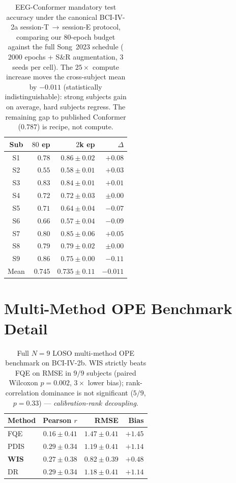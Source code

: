 \documentclass[conference]{IEEEtran}
\newcommand{\bcia}{BCI-IV-2a}
\newcommand{\bcib}{BCI-IV-2b}
\newcommand{\fqe}{FQE}
\begin{document}
\begin{table}[H]
\centering
\caption{EEG-Conformer mandatory test accuracy under the canonical
\bcia{} session-T\,$\to$\,session-E protocol, comparing our
$80$-epoch budget against the full Song~2023 schedule ($2000$
epochs + S\&R augmentation, 3 seeds per cell). The $25\times$
compute increase moves the cross-subject mean by $-0.011$
(statistically indistinguishable): strong subjects gain on average,
hard subjects regress. The remaining gap to published Conformer
($0.787$) is recipe, not compute.}
\label{tab:app:conformer_2k}
\footnotesize
\setlength{\tabcolsep}{3pt}
\begin{tabular}{c r r r}
\toprule
Sub & $80$ ep & $2$k ep & $\Delta$ \\
\midrule
S1 & $0.78$ & $0.86 \pm 0.02$ & $+0.08$ \\
S2 & $0.55$ & $0.58 \pm 0.01$ & $+0.03$ \\
S3 & $0.83$ & $0.84 \pm 0.01$ & $+0.01$ \\
S4 & $0.72$ & $0.72 \pm 0.03$ & $\pm 0.00$ \\
S5 & $0.71$ & $0.64 \pm 0.04$ & $-0.07$ \\
S6 & $0.66$ & $0.57 \pm 0.04$ & $-0.09$ \\
S7 & $0.80$ & $0.85 \pm 0.06$ & $+0.05$ \\
S8 & $0.79$ & $0.79 \pm 0.02$ & $\pm 0.00$ \\
S9 & $0.86$ & $0.75 \pm 0.00$ & $-0.11$ \\
\midrule
Mean & $0.745$ & $0.735 \pm 0.11$ & $-0.011$ \\
\bottomrule
\end{tabular}
\end{table}

\section{Multi-Method OPE Benchmark Detail}\label{app:multi_ope}

\begin{table}[H]
\centering
\caption{Full $N\!=\!9$ LOSO multi-method OPE benchmark on \bcib{}.
WIS strictly beats \fqe{} on RMSE in $9/9$ subjects (paired
Wilcoxon $p\!=\!0.002$, $3\times$ lower bias); rank-correlation
dominance is not significant ($5/9$, $p\!=\!0.33$) ---
\emph{calibration-rank decoupling}.}
\label{tab:app:multimethod}
\footnotesize
\begin{tabular}{l r r r}
\toprule
Method & Pearson $r$ & RMSE & Bias \\
\midrule
\fqe{}              & $0.16 \pm 0.41$ & $1.47 \pm 0.41$ & $+1.45$ \\
PDIS                & $0.29 \pm 0.34$ & $1.19 \pm 0.41$ & $+1.14$ \\
\textbf{WIS}        & $0.27 \pm 0.38$ & $\mathbf{0.82 \pm 0.39}$ & $\mathbf{+0.48}$ \\
DR                  & $0.29 \pm 0.34$ & $1.18 \pm 0.41$ & $+1.14$ \\
\bottomrule
\end{tabular}
\end{table}
\end{document}

